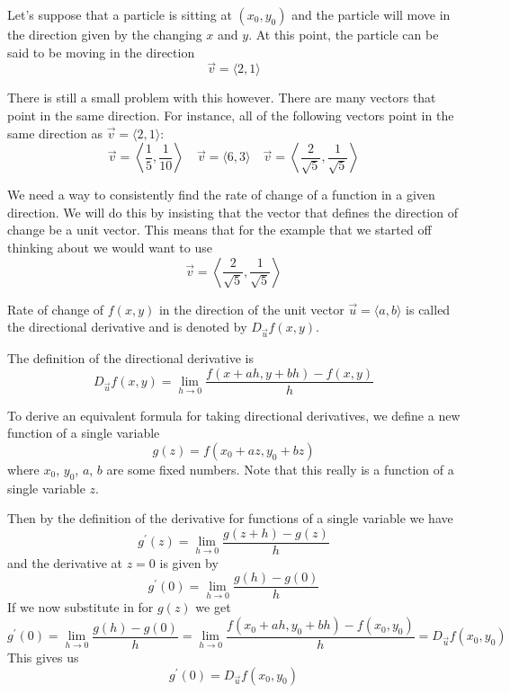 Let's suppose that a particle is sitting at $(x_0,y_0)$ and the particle will move in the direction given by the changing 
$x$ and $y$. At this point, the particle can be said to be moving in the direction
\[ \vec{v} = \langle {2,1} \rangle \]

There is still a small problem with this however. There are many vectors that point in the same direction. For instance, all of the following vectors point in the same direction as $\vec v = \langle {2,1} \rangle$:
\[ \vec{v} = \left\langle {\frac{1}{5},\frac{1}{10}}\right\rangle \quad \vec{v} = \langle {6,3}\rangle \quad \vec{v} = \left\langle {\frac{2}{\sqrt{5}},\frac{1}{\sqrt{5}}}\right\rangle \]

We need a way to consistently find the rate of change of a function in a given direction. We will do this by insisting that the vector that defines the direction of change be a unit vector. This means that for the example that we started off thinking about we would want to use
\[ \vec{v} = \left\langle {\frac{2}{\sqrt{5}},\frac{1}{\sqrt{5}}}\right\rangle \]

\begin{definition}
Rate of change of $f(x,y)$ in the direction of the unit vector $\vec{u}=\langle{a,b}\rangle$ is called the directional derivative and is denoted by $D_{\vec{u}} f(x,y)$.

The definition of the directional derivative is
\begin{equation}
{D_{\vec u}}f(x,y) = \lim_{h\to0} \frac{f(x + ah,y + bh) - f(x,y)}{h}
\end{equation}
\end{definition}

To derive an equivalent formula for taking directional derivatives, we define a new function of a single variable
\[ g(z) = f(x_0+az,y_0+bz) \]
where $x_0$, $y_0$, $a$, $b$ are some fixed numbers. Note that this really is a function of a single variable $z$.

Then by the definition of the derivative for functions of a single variable we have
\[ g^\prime(z) = \lim_{h\to0} \frac{g(z+h)-g(z)}{h} \]
and the derivative at $z=0$ is given by
\[ g^\prime(0) = \lim_{h\to0} \frac{g(h)-g(0)}{h} \]
If we now substitute in for $g(z)$ we get
\[ g^\prime(0) = \lim_{h\to0} \frac{g(h)-g(0)}{h} = \lim_{h\to0} \frac{f(x_0+ah,y_0+bh) - f(x_0,y_0)}{h} = D_{\vec u}f(x_0,y_0) \]
This gives us
\begin{equation}\tag{1}
g^\prime(0) = D_{\vec u}f(x_0,y_0)
\end{equation}

